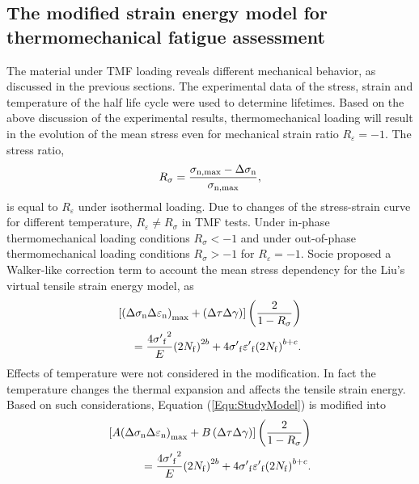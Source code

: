 \documentclass[preprint,5p,twocolumn,11pt,sort&compress]{elsarticle}
\begin{document}
\subsection{The modified strain energy model for thermomechanical fatigue assessment}
The material under TMF loading reveals different mechanical behavior, as discussed in the previous sections. 
The experimental data of the stress, strain and temperature of the half life cycle were used to determine lifetimes.
Based on the above discussion of the experimental results, thermomechanical loading  will result in the evolution of the mean stress even for mechanical strain ratio $R_{\varepsilon}=-1$. The stress ratio,
\begin{equation}
{R_\sigma } = \frac{{{\sigma _{\rm n,\max }} - \Delta {\sigma _{\rm n}}}}{{{\sigma _{\rm n,\max }}}},
\end{equation}
is equal to $R_{\varepsilon}$ under isothermal loading. Due to changes of the stress-strain curve for different temperature, $R_{\varepsilon}\ne R_{\sigma}$ in TMF tests. Under in-phase thermomechanical loading conditions ${R_\sigma }<-1$ and under out-of-phase thermomechanical loading conditions ${R_\sigma }>-1$ for $R_{\varepsilon}=-1$.
Socie \cite{Socie2000} proposed a Walker-like correction term \cite{Walker1970} to account the mean stress dependency for the Liu's virtual tensile strain energy model, as
\begin{equation}
\begin{aligned}
\left[ {{{\left( {\Delta {\sigma _{\rm n}}\Delta {\varepsilon _{\rm n}}} \right)}_{\max }} + \left( {\Delta \tau \Delta \gamma } \right)} \right]\left( {\frac{2}{{1 - {R_\sigma }}}} \right)\\
= \frac{{4{{\sigma '}_{\rm f}}^2}}{E}{\left( {2{N_{\rm f}}} \right)^{2b}} + 4{{\sigma '}_{\rm f}}{{\varepsilon '}_{\rm f}}{\left( {2{N_{\rm f}}} \right)^{b + c}}.
\end{aligned}
\label{Equ:StudyModel}
\end{equation}
Effects of temperature were not considered in the modification. In fact the temperature changes the thermal expansion and affects the tensile strain energy. 
Based on such considerations, Equation (\ref{Equ:StudyModel}) is modified into
\begin{equation}
\begin{aligned}
\left[ {A{{\left( {\Delta {\sigma _{\rm n}}\Delta {\varepsilon _{\rm n}}} \right)}_{\max }} + B\left( {\Delta \tau \Delta \gamma } \right)} \right]\left( {\frac{2}{{1 - {R_\sigma }}}} \right)\\
= \frac{{4{{\sigma '}_{\rm f}}^2}}{E}{\left( {2{N_{\rm f}}} \right)^{2b}} + 4{{\sigma '}_{\rm f}}{{\varepsilon '}_{\rm f}}{\left( {2{N_{\rm f}}} \right)^{b + c}}.
\end{aligned}
\label{Equ:StudyModel}
\end{equation}
\end{document}
